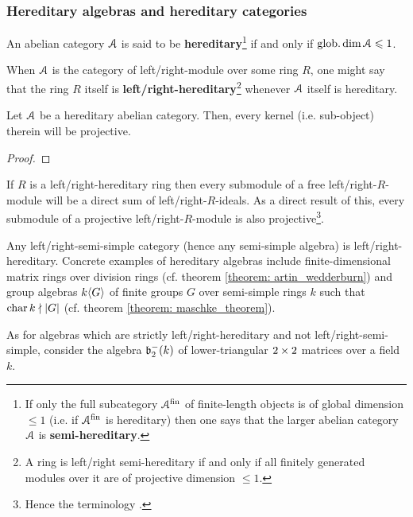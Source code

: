         \subsubsection{Hereditary algebras and hereditary categories}
            \begin{definition} \label{def: hereditary_abelian_categories}
                An abelian category $\mathcal{A}$ is said to be \textbf{hereditary}\footnote{If only the full subcategory $\mathcal{A}^{\mathrm{fin}}$ of finite-length objects is of global dimension $\leq 1$ (i.e. if $\mathcal{A}^{\mathrm{fin}}$ is hereditary) then one says that the larger abelian category $\mathcal{A}$ is \textbf{semi-hereditary}.} if and only if $\operatorname{glob.dim} \mathcal{A} \leqslant 1$.
            \end{definition}
            \begin{convention} \label{conv: left/right_hereditary_rings}
                When $\mathcal{A}$ is the category of left/right-module over some ring $R$, one might say that the ring $R$ itself is \textbf{left/right-hereditary}\footnote{A ring is left/right semi-hereditary if and only if all finitely generated modules over it are of projective dimension $\leq 1$.} whenever $\mathcal{A}$ itself is hereditary.
            \end{convention}
            \begin{proposition} \label{prop: kernels_in_hereditary_abelian_categories_are_projective}
                Let $\mathcal{A}$ be a hereditary abelian category. Then, every kernel (i.e. sub-object) therein will be projective.
            \end{proposition}
                \begin{proof}
                    
                \end{proof}
            \begin{corollary} \label{coro: kaplansky_theorem}
                If $R$ is a left/right-hereditary ring then every submodule of a free left/right-$R$-module will be a direct sum of left/right-$R$-ideals. As a direct result of this, every submodule of a projective left/right-$R$-module is also projective\footnote{Hence the terminology .}.
            \end{corollary}
            \begin{example}
                Any left/right-semi-simple category (hence any semi-simple algebra) is left/right-hereditary. Concrete examples of hereditary algebras include finite-dimensional matrix rings over division rings (cf. theorem \ref{theorem: artin_wedderburn}) and group algebras $k\langle G\rangle$ of finite groups $G$ over semi-simple rings $k$ such that $\operatorname{char} k \nmid |G|$ (cf. theorem \ref{theorem: maschke_theorem}).
                
                As for algebras which are strictly left/right-hereditary and not left/right-semi-simple, consider the algebra $\mathfrak{b}_2^-(k)$ of lower-triangular $2 \x 2$ matrices over a field $k$.
            \end{example}
            
